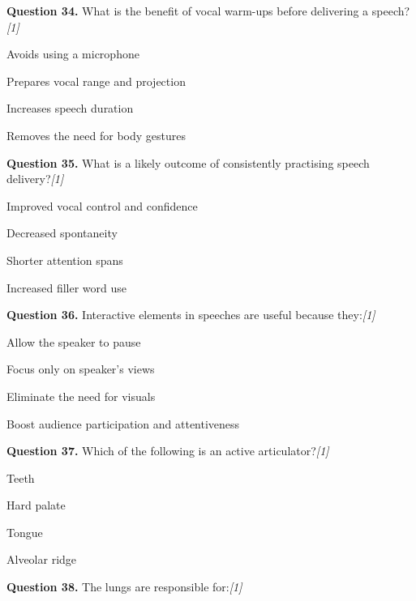 \documentclass[11pt,a4paper]{article}
\newcommand{\pts}[1]{\hfill   \textit{[#1]}}
\begin{document}
\medskip


\noindent   \textbf{Question 34.} What is the benefit of vocal warm-ups before delivering a speech?\pts{1}

\begin{parts}
  \item Avoids using a microphone
  \item Prepares vocal range and projection
  \item Increases speech duration
  \item Removes the need for body gestures
\end{parts}

\medskip


\noindent   \textbf{Question 35.} What is a likely outcome of consistently practising speech delivery?\pts{1}

\begin{parts}
  \item Improved vocal control and confidence
  \item Decreased spontaneity
  \item Shorter attention spans
  \item Increased filler word use
\end{parts}

\medskip


\noindent   \textbf{Question 36.} Interactive elements in speeches are useful because they:\pts{1}

\begin{parts}
  \item Allow the speaker to pause
  \item Focus only on speaker's views
  \item Eliminate the need for visuals
  \item Boost audience participation and attentiveness
\end{parts}

\medskip


\noindent   \textbf{Question 37.} Which of the following is an active articulator?\pts{1}

\begin{parts}
  \item Teeth
  \item Hard palate
  \item Tongue
  \item Alveolar ridge
\end{parts}

\medskip


\noindent   \textbf{Question 38.} The lungs are responsible for:\pts{1}
\end{document}
